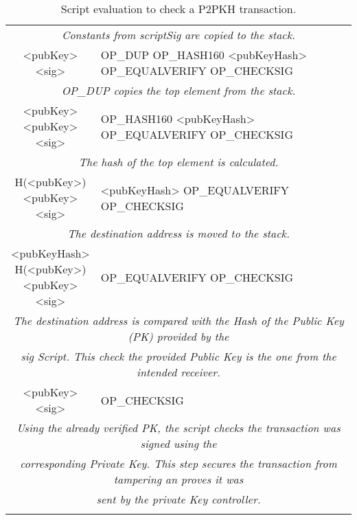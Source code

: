	\begin{table}[]
		\small
		\caption{Script evaluation to check a P2PKH transaction.}
		\label{tab:exec_1_step}
		\begin{tabularx}{\textwidth}{| c | X |}
			\hline
				\thead{Stack} & \thead{Script} \\
			\hline
			\multicolumn{2}{|c|}{\textit{Constants from scriptSig are copied to the stack.}} \\
			\hline
			\makecell{<pubKey>\\<sig>} & OP\_DUP \footnotesize{OP\_HASH160 <pubKeyHash> OP\_EQUALVERIFY OP\_CHECKSIG} \\
			\hline
			\multicolumn{2}{|c|}{\textit{OP\_DUP copies the top element from the stack.}} \\
			\hline
			\makecell{<pubKey> \\ <pubKey> \\ <sig>} & OP\_HASH160 \footnotesize{<pubKeyHash> OP\_EQUALVERIFY OP\_CHECKSIG} \\
			\hline
			\multicolumn{2}{|c|}{\textit{The hash of the top element is calculated.}} \\
			\hline
			\makecell{H(<pubKey>) \\ <pubKey> \\ <sig>} & <pubKeyHash> \footnotesize{OP\_EQUALVERIFY OP\_CHECKSIG} \\
			\hline
			\multicolumn{2}{|c|}{\textit{The destination address is moved to the stack.}} \\
			\hline
			\makecell{<pubKeyHash> \\ H(<pubKey>) \\ <pubKey> \\ <sig>} & OP\_EQUALVERIFY \footnotesize{OP\_CHECKSIG} \\
			\hline
			\multicolumn{2}{|c|}{\textit{The destination address is compared with the Hash of the Public Key (PK) provided by the}} \\
			\multicolumn{2}{|c|}{\textit{sig Script. This check the provided Public Key is the one from the intended receiver.}} \\
			\hline
			\makecell{<pubKey> \\ <sig>} & OP\_CHECKSIG \\
			\hline
			\multicolumn{2}{|c|}{\textit{Using the already verified PK, the script checks the transaction was signed using the}} \\
			\multicolumn{2}{|c|}{\textit{corresponding Private Key. This step secures the transaction from tampering an proves it was}} \\
			\multicolumn{2}{|c|}{\textit{sent by the private Key controller.}} \\
			\hline
			\makecell{True} & \\
			\hline
		\end{tabularx}
	\end{table}


